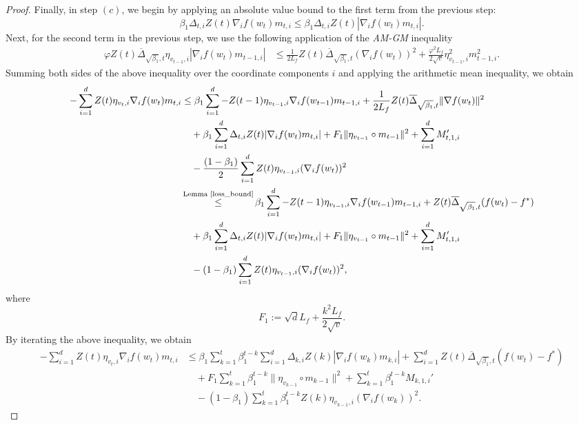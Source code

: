 \documentclass{article} %
\begin{document}
\begin{proof}
Finally, in step \((c)\), we begin by applying an absolute value bound to the first term from the previous step:
\[\beta_{1} \Delta_{t,i} Z(t) \nabla_{i} f(w_{t}) m_{t,i} \leq \beta_{1} \Delta_{t,i} Z(t) |\nabla_{i} f(w_{t}) m_{t,i}|.\]
Next, for the second term in the previous step, we use the following application of the \emph{AM-GM} inequality
\begin{align*}
 \varphi Z(t)\overline{\Delta}_{\sqrt{\beta_{1}},t}\eta_{v_{t-1},i}|\nabla_{i}f(w_{t})m_{t-1,i}|&\le  \frac{1}{2L_{f}}Z(t)\overline{\Delta}_{\sqrt{\beta_{1}},t}(\nabla_{i}f(w_{t})  )^{2}+\frac{\varphi^{2}L_{f}}{2\sqrt{v}}\eta_{v_{t-1},i}^{2}m_{t-1,i}^{2}.
\end{align*}
Summing both sides of the above inequality over the coordinate components \(i\) and applying the arithmetic mean inequality, we obtain
\begin{align*}
-\sum_{i=1}^{d}Z(t)\eta_{v_{t},i}\nabla_{i}f(w_{t})m_{t,i}&\le \beta_{1}\sum_{i=1}^{d}-Z(t-1)\eta_{v_{t-1},i}\nabla_{i}f(w_{t-1})m_{t-1,i}+\frac{1}{2L_{f}}Z(t)\overline{\Delta}_{\sqrt{\beta_{1}},t}\|\nabla f(w_{t})  \|^{2}\\&\quad+\beta_{1}\sum_{i=1}^{d}\Delta_{t,i}Z(t)|\nabla_{i}f(w_{t})m_{t,i}|+F_{1}\|\eta_{v_{t-1}}\circ m_{t-1}\|^{2}+\sum_{i=1}^{d}M'_{t,1,i}\\&\quad-\frac{(1-\beta_{1})}{2}\sum_{i=1}^{d}Z(t)\eta_{v_{t-1},i}(\nabla_{i}f(w_{t}))^{2}\\&\mathop{\le}^{\text{Lemma \ref{loss_bound}}}\beta_{1}\sum_{i=1}^{d}-Z(t-1)\eta_{v_{t-1},i}\nabla_{i}f(w_{t-1})m_{t-1,i}+Z(t)\overline{\Delta}_{\sqrt{\beta_{1}},t}(f(w_{t})-f^*)\\&\quad+\beta_{1}\sum_{i=1}^{d}\Delta_{t,i}Z(t)|\nabla_{i}f(w_{t})m_{t,i}|+F_{1}\|\eta_{v_{t-1}}\circ m_{t-1}\|^{2}+\sum_{i=1}^{d}M'_{t,1,i}\\&\quad-(1-\beta_{1})\sum_{i=1}^{d}Z(t)\eta_{v_{t-1},i}(\nabla_{i}f(w_{t}))^{2},
\end{align*}
where 
$$F_{1}:=\sqrt{d}L_{f}+\frac{k^{2}L_{f}}{2\sqrt{v}}.$$
By iterating the above inequality, we obtain
\begin{align*}
  -\sum_{i=1}^{d}Z(t)\eta_{v_{t},i}\nabla_{i}f(w_{t})m_{t,i}&\le \beta_{1}{\sum_{k=1}^{t}\beta_{1}^{t-k}  \sum_{i=1}^{d}\Delta_{k,i}Z(k)|\nabla_{i}f(w_{k})m_{k,i}|}+\sum_{i=1}^{d}Z(t)\overline{\Delta}_{\sqrt{\beta_{1}},t}(f(w_{t})-f^*)\\&\quad+F_{1}\sum_{k=1}^{t}\beta_{1}^{t-k}\|\eta_{v_{k-1}}\circ m_{k-1}\|^{2}+\sum_{k=1}^{t}\beta_{1}^{t-k}M_{k,1,i}'\\&\quad-({1-\beta_{1}})\sum_{k=1}^{t}\beta_{1}^{t-k}Z(k)\eta_{v_{k-1},i}(\nabla_{i}f(w_{k}))^{2}.

\end{align*}
\end{proof}
\end{document}
